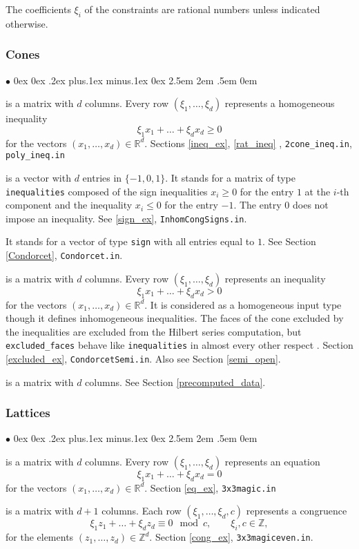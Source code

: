 \documentclass[12pt,a4paper]{scrartcl}
\newcommand{\stdli}{ \topsep0ex \partopsep0ex %
\parsep.2ex plus.1ex minus.1ex \itemsep0ex%
\leftmargin2.5em \labelwidth2em \labelsep.5em \rightmargin0em}%
\renewenvironment{itemize}{\begin{list}{{$\bullet$}}{\stdli}}{\end{list}}
\theoremstyle{definition}
\def\ZZ{{\mathbb Z}}
\def\RR{{\mathbb R}}
\def\itemtt[#1]{\item[\textbf{\ttt{#1}}]}
\def\ttt{\texttt}
\begin{document}
The coefficients $\xi_i$ of the constraints are rational numbers unless indicated otherwise.

\subsubsection{Cones} \label{HomConstrCone}

\begin{itemize}
	\itemtt[inequalities] is a matrix with $d$ columns. Every row $(\xi_1,\dots,\xi_d)$ represents a homogeneous inequality
	$$
	\xi_1x_1+\dots+\xi_dx_d\ge 0
	$$
	for the vectors $(x_1,\dots,x_d)\in\RR^d$. Sections \ref{ineq_ex}, \ref{rat_ineq} , \verb|2cone_ineq.in|, \verb|poly_ineq.in|
	
	\itemtt[signs] is a vector with $d$ entries in $\{-1,0,1\}$.
	It stands for a matrix of type \verb|inequalities| composed of the sign inequalities $x_i\ge 0$ for the entry $1$ at the $i$-th component and the inequality $x_i\le 0$ for the entry $-1$. The entry $0$ does not impose an inequality. See \ref{sign_ex}, \verb|InhomCongSigns.in|.
	
	\itemtt[nonnegative] It stands for a vector of type \verb|sign| with all entries equal to $1$. See Section \ref{Condorcet}, \verb|Condorcet.in|.
	
	\itemtt[excluded\_faces]  is a matrix with $d$ columns. Every row $(\xi_1,\dots,\xi_d)$ represents an inequality
	$$
	\xi_1x_1+\dots+\xi_dx_d> 0
	$$
	for the vectors $(x_1,\dots,x_d)\in\RR^d$. It is considered as a homogeneous input type though it defines inhomogeneous inequalities. The faces of the cone excluded by the inequalities are excluded from the Hilbert series computation, but \verb|excluded_faces| behave like \verb|inequalities| in almost every other respect . 
	Section \ref{excluded_ex}, \verb|CondorcetSemi.in|. Also see Section \ref{semi_open}.
	
	\itemtt[support\_hyperplanes] is a matrix with $d$ columns. See Section \ref{precomputed_data}.
\end{itemize}

\subsubsection{Lattices}

\begin{itemize}
	\itemtt[equations] is a matrix with $d$ columns. Every row $(\xi_1,\dots,\xi_d)$ represents an equation
	$$
	\xi_1x_1+\dots+\xi_dx_d= 0
	$$
	for the vectors $(x_1,\dots,x_d)\in\RR^d$. Section \ref{eq_ex}, \verb|3x3magic.in|
	
	\itemtt[congruences] is a matrix with $d+1$ columns. Each row $(\xi_1,\dots,\xi_d,c)$ represents a congruence
	$$
	\xi_1z_1+\dots+\xi_dz_d\equiv 0 \mod c, \qquad \xi_i,c\in\ZZ,
	$$
	for the elements $(z_1,\dots,z_d)\in\ZZ^d$. Section \ref{cong_ex}, \verb|3x3magiceven.in|.
\end{itemize}
\end{document}
